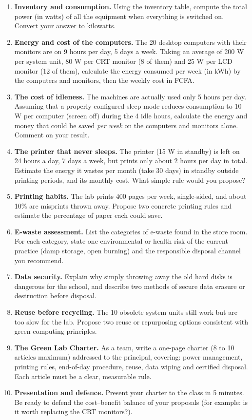 \documentclass[11pt]{article}
\begin{document}
\begin{enumerate}
\item \textbf{Inventory and consumption.} Using the inventory table, compute the total power (in watts) of all the equipment when everything is switched on. Convert your answer to kilowatts.
\item \textbf{Energy and cost of the computers.} The 20 desktop computers with their monitors are on 9 hours per day, 5 days a week. Taking an average of 200 W per system unit, 80 W per CRT monitor (8 of them) and 25 W per LCD monitor (12 of them), calculate the energy consumed per week (in kWh) by the computers and monitors, then the weekly cost in FCFA.
\item \textbf{The cost of idleness.} The machines are actually used only 5 hours per day. Assuming that a properly configured sleep mode reduces consumption to 10 W per computer (screen off) during the 4 idle hours, calculate the energy and money that could be saved \emph{per week} on the computers and monitors alone. Comment on your result.
\item \textbf{The printer that never sleeps.} The printer (15 W in standby) is left on 24 hours a day, 7 days a week, but prints only about 2 hours per day in total. Estimate the energy it wastes per month (take 30 days) in standby outside printing periods, and its monthly cost. What simple rule would you propose?
\item \textbf{Printing habits.} The lab prints 400 pages per week, single-sided, and about 10\% are misprints thrown away. Propose two concrete printing rules and estimate the percentage of paper each could save.
\item \textbf{E-waste assessment.} List the categories of e-waste found in the store room. For each category, state one environmental or health risk of the current practice (damp storage, open burning) and the responsible disposal channel you recommend.
\item \textbf{Data security.} Explain why simply throwing away the old hard disks is dangerous for the school, and describe two methods of secure data erasure or destruction before disposal.
\item \textbf{Reuse before recycling.} The 10 obsolete system units still work but are too slow for the lab. Propose two reuse or repurposing options consistent with green computing principles.
\item \textbf{The Green Lab Charter.} As a team, write a one-page charter (8 to 10 articles maximum) addressed to the principal, covering: power management, printing rules, end-of-day procedure, reuse, data wiping and certified disposal. Each article must be a clear, measurable rule.
\item \textbf{Presentation and defence.} Present your charter to the class in 5 minutes. Be ready to defend the cost--benefit balance of your proposals (for example: is it worth replacing the CRT monitors?).
\end{enumerate}
\end{document}
